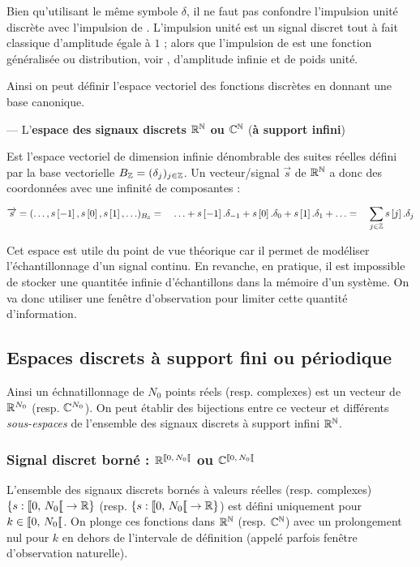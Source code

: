\begin{remarque}
  Bien qu'utilisant le même symbole $\delta$, il ne faut pas confondre
  l'impulsion unité discrète avec l'impulsion de \Dirac. L'impulsion
  unité est un signal discret tout à fait classique d'amplitude égale
  à $1$ ; alors que l'impulsion de \Dirac{} est une fonction
  généralisée ou distribution, voir , d'amplitude
  infinie et de poids unité.
\end{remarque}

Ainsi on peut définir l'espace vectoriel des fonctions discrètes en
donnant une base canonique.

\begin{definition}
  \label{def:signal_discret}
  --- L'\textbf{espace des signaux discrets $\mathbb{R}^{\mathbb{N}}$ ou $\mathbb{C}^{\mathbb{N}}$} (\textbf{à support infini})

  Est l'espace vectoriel de dimension infinie dénombrable des suites
  réelles défini par la base vectorielle
  $B_{\mathbb{Z}}=(\delta_j)_{j\in\mathbb{Z}}$. Un vecteur/signal $\vec{s}$ de $\mathbb{R}^{\mathbb{N}}$ a
  donc des coordonnées avec une infinité de composantes :
  \begin{equation*}
    \overrightarrow{s}  = (\ldots,s\left[-1\right], s\left[0\right], s\left[1\right], \ldots)_{B_{\mathbb{Z}}} = \quad \ldots + s\left[-1\right].\delta_{-1} + s\left[0\right].\delta_0 + s\left[1\right].\delta_1 + \ldots =\quad \sum\limits_{j\in\mathbb{Z}}^{}{s\left[j\right].\delta_j}
  \end{equation*}

\end{definition}

Cet espace est utile du point de vue théorique car il permet de
modéliser l'échantillonnage d'un signal continu. En revanche, en
pratique, il est impossible de stocker une quantitée infinie
d'échantillons dans la mémoire d'un système. On va donc utiliser une
fenêtre d'observation pour limiter cette quantité d'information.


\subsection{Espaces discrets à support fini ou périodique}
Ainsi un échnatillonnage de $N_0$ points réels (resp. complexes) est
un vecteur de $\mathbb{R}^{N_0}$ (resp. $\mathbb{C}^{N_0}$). On peut établir des
bijections entre ce vecteur et différents \emph{sous-espaces} de
l'ensemble des signaux discrets à support infini $\mathbb{R}^{\mathbb{N}}$.



\subsubsection{Signal discret borné :  $\RNborne$ ou $\CNborne$}
L'ensemble des signaux discrets bornés à valeurs réelles
(resp. complexes) $\left\{s : \SN0 \to \R \right\}$ (resp.
$\left\{s : \SN0 \to \R \right\}$) est défini uniquement pour
$k\in\SN0$. On plonge ces fonctions dans $\mathbb{R}^{\mathbb{N}}$ (resp. $\mathbb{C}^{\mathbb{N}}$) avec un
prolongement nul pour $k$ en dehors de l'intervale de définition
(appelé parfois fenêtre d'observation naturelle).

